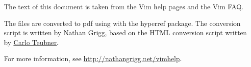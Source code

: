 \begin{minipage}{5in}
The text of this document is taken from the Vim
help pages and the Vim FAQ.

\bigskip

The files are converted to pdf using \engine with the hyperref package.
The conversion script
is written by Nathan Grigg, based on the HTML conversion script written
by \href{http://github.com/c4rlo/vimhelp/}{Carlo Teubner}.

\bigskip

For more information, see
\href{http://nathangrigg.net/vimhelp}{http://nathangrigg.net/vimhelp}.
\end{minipage}
